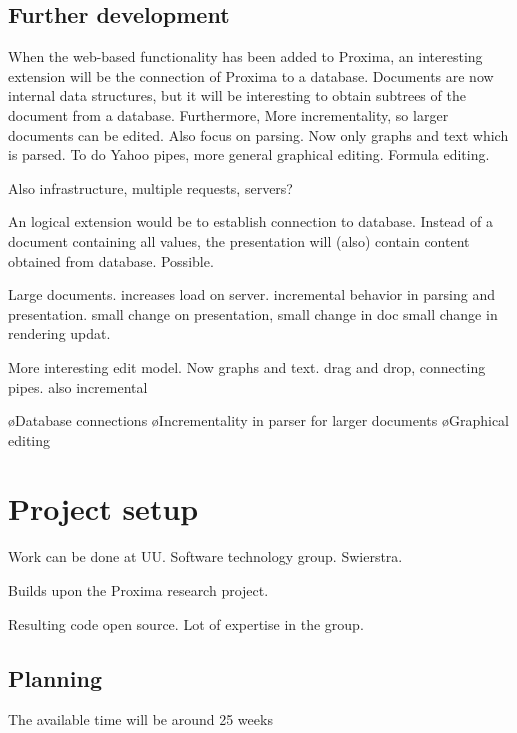 
\subsection{Further development}


When the web-based functionality has been added to Proxima, an interesting extension will be the connection of Proxima to a database. Documents are now internal data structures, but it will be interesting to obtain subtrees of the document from a database. Furthermore, More incrementality, so larger documents can be edited. Also focus on parsing. Now only graphs and text which is parsed. To do Yahoo pipes, more general graphical editing. Formula editing.

Also infrastructure, multiple requests, servers? 


An logical extension would be to establish connection to database. Instead of a document containing all values, the presentation will (also) contain content obtained from database. Possible.

Large documents. increases load on server. incremental behavior in parsing and presentation. small change on presentation, small change in doc small change in rendering updat.

More interesting edit model. Now graphs and text. drag and drop, connecting pipes. also incremental

\bl
\o Database connections
\o Incrementality in parser for larger documents
\o Graphical editing
\el

\section{Project setup}

Work can be done at UU. Software technology group. Swierstra.

Builds upon the Proxima research project.

Resulting code open source. Lot of expertise in the group.

\subsection{Planning}

The available time will be around 25 weeks

